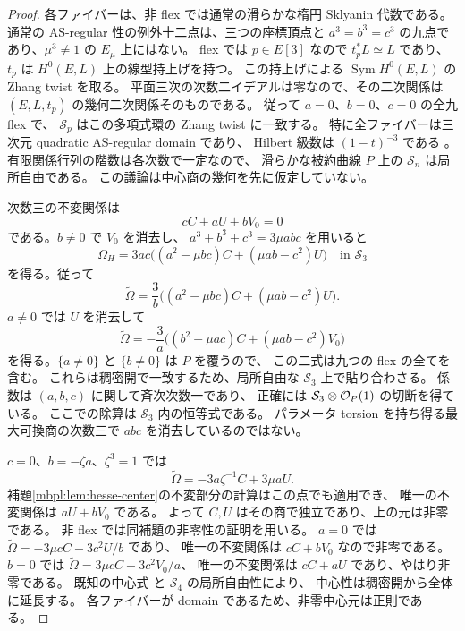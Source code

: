 \begin{proof}
各ファイバーは、非 flex では通常の滑らかな楕円 Sklyanin 代数である。
通常の AS-regular 性の例外十二点は、三つの座標頂点と
$a^3=b^3=c^3$ の九点であり、$\mu^3\ne1$ の $E_\mu$ 上にはない。
flex では $p\in E[3]$ なので $t_p^*L\simeq L$ であり、
$t_p$ は $H^0(E,L)$ 上の線型持上げを持つ。
この持上げによる $\operatorname{Sym}H^0(E,L)$ の Zhang twist を取る。
平面三次の次数二イデアルは零なので、その二次関係は
$(E,L,t_p)$ の幾何二次関係そのものである。
従って $a=0$、$b=0$、$c=0$ の全九 flex で、
$\mathcal S_p$ はこの多項式環の Zhang twist に一致する。
特に全ファイバーは三次元 quadratic AS-regular domain であり、
Hilbert 級数は $(1-t)^{-3}$ である
\cite[Theorems~6.6, 6.8]{GRSklyaninATV}
\cite[Section~1]{GRSklyaninST}。
有限関係行列の階数は各次数で一定なので、
滑らかな被約曲線 $P$ 上の $\mathcal S_n$ は局所自由である。
この議論は中心商の幾何を先に仮定していない。

次数三の不変関係は
\[
 cC+aU+bV_0=0
\]
である。$b\ne0$ で $V_0$ を消去し、
$a^3+b^3+c^3=3\mu abc$ を用いると
\begin{equation}\label{mbhp:eq:division-certificate}
 \Omega_H
   =3ac\bigl((a^2-\mu bc)C+(\mu ab-c^2)U\bigr)
       \quad\text{in }\mathcal S_3
\end{equation}
を得る。従って
\begin{equation}\label{mbhp:eq:regular-chart}
 \widetilde\Omega
   =\frac3b\bigl((a^2-\mu bc)C+(\mu ab-c^2)U\bigr).
\end{equation}
$a\ne0$ では $U$ を消去して
\[
 \widetilde\Omega
   =-\frac3a\bigl((b^2-\mu ac)C+(\mu ab-c^2)V_0\bigr)
\]
を得る。$\{a\ne0\}$ と $\{b\ne0\}$ は $P$ を覆うので、
この二式は九つの flex の全てを含む。
これらは稠密開で一致するため、局所自由な $\mathcal S_3$ 上で貼り合わさる。
係数は $(a,b,c)$ に関して斉次次数一であり、
正確には $\mathcal S_3\otimes\mathcal O_P(1)$ の切断を得ている。
ここでの除算は $\mathcal S_3$ 内の恒等式である。
パラメータ torsion を持ち得る最大可換商の次数三で
$abc$ を消去しているのではない。

$c=0$、$b=-\zeta a$、$\zeta^3=1$ では
\[
 \widetilde\Omega=-3a\zeta^{-1}C+3\mu aU.
\]
補題\ref{mbpl:lem:hesse-center}の不変部分の計算はこの点でも適用でき、
唯一の不変関係は $aU+bV_0$ である。
よって $C,U$ はその商で独立であり、上の元は非零である。
非 flex では同補題の非零性の証明を用いる。
$a=0$ では
$\widetilde\Omega=-3\mu cC-3c^2U/b$ であり、
唯一の不変関係は $cC+bV_0$ なので非零である。
$b=0$ では
$\widetilde\Omega=3\mu cC+3c^2V_0/a$、
唯一の不変関係は $cC+aU$ であり、やはり非零である。
既知の中心式
\cite[Section~2, p.~3]{GRSklyaninDLL}
\cite[p.~35, Remark~(1)]{GRSklyaninST}
と $\mathcal S_4$ の局所自由性により、
中心性は稠密開から全体に延長する。
各ファイバーが domain であるため、非零中心元は正則である。


\end{proof}
